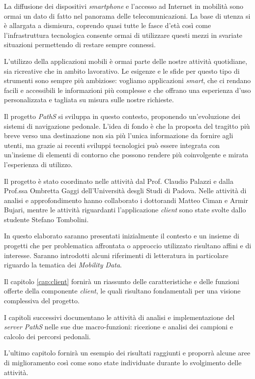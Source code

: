 La diffusione dei dispositivi \emph{smartphone} e l'accesso ad Internet in mobilità sono ormai un dato di fatto nel panorama delle telecomunicazioni. La base di utenza si è allargata a dismisura, coprendo quasi tutte le fasce d'età così come l'infrastruttura tecnologica consente ormai di utilizzare questi mezzi in svariate situazioni permettendo di restare sempre connessi. 

L'utilizzo della applicazioni mobili è ormai parte delle nostre attività quotidiane, sia ricreative che in ambito lavorativo. Le esigenze e le sfide per questo tipo di strumenti sono sempre più ambiziose: vogliamo applicazioni \emph{smart}, che ci rendano facili e accessibili le informazioni più complesse e che offrano una esperienza d'uso personalizzata e tagliata su misura sulle nostre richieste.

Il progetto \emph{PathS} si sviluppa in questo contesto, proponendo un'evoluzione dei sistemi di navigazione pedonale. L'idea di fondo è che la  proposta del tragitto più breve verso una destinazione non sia più l'unica informazione da fornire agli utenti, ma grazie ai recenti sviluppi tecnologici può essere integrata con un'insieme di elementi di contorno che possono rendere più coinvolgente e mirata l'esperienza di utilizzo.

Il progetto è stato coordinato nelle attività dal Prof. Claudio Palazzi e dalla Prof.ssa Ombretta Gaggi dell'Università desgli Studi di Padova. Nelle attività di analisi e approfondimento hanno collaborato i dottorandi Matteo Ciman e Armir Bujari, mentre le attività riguardanti l'applicazione \emph{client} sono state svolte dallo studente Stefano Tombolini.

In questo elaborato saranno presentati inizialmente il contesto e un insieme di progetti che per problematica affrontata o approccio utilizzato risultano affini e di interesse. Saranno introdotti alcuni riferimenti di letteratura in particolare riguardo la tematica dei \emph{Mobility Data}.

Il capitolo \ref{cap:client} fornirà un riassunto delle caratteristiche e delle funzioni offerte della componente \emph{client}, le quali risultano fondamentali per una visione complessiva del progetto.

I capitoli successivi documentano le attività di analisi e implementazione del \emph{server PathS} nelle sue due macro-funzioni: ricezione e analisi dei campioni e calcolo dei percorsi pedonali.

L'ultimo capitolo fornirà un esempio dei risultati raggiunti e proporrà alcune aree di miglioramento così come sono state individuate durante lo svolgimento delle attività.
